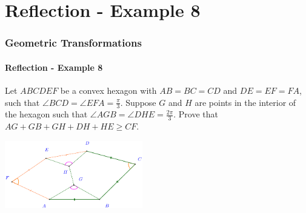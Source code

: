 \documentclass[8pt,xcolor=table,dvipsnames]{beamer}
\begin{document}
\section{Reflection - Example 8}

\begin{frame}[t]
    \frametitle{Geometric Transformations}
    \framesubtitle{Reflection - Example 8}
    \begin{example}
        Let $ABCDEF$ be a convex hexagon with $AB = BC = CD$ and $DE = EF = FA$,
        such that $\angle BCD = \angle EFA = \frac {\pi}{3}$.
        Suppose $G$ and $H$ are points in the interior of the hexagon
        such that $\angle AGB = \angle DHE = \frac {2\pi}{3}$.
        Prove that $AG + GB + GH + DH + HE \geq CF$.
    \end{example}

    \bigbreak
    \begin{center}
        \includegraphics[width=6cm]{./svg/pdf/imo-1995-5-1.pdf}
    \end{center}
\end{frame}
\end{document}
